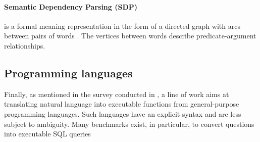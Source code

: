 
\paragraph{Semantic Dependency Parsing (SDP)} is a formal meaning representation in the form of a directed graph with arcs between pairs of words \parencite{oepen_15}. The vertices between words describe predicate-argument relationships. 

\subsection{Programming languages}

Finally, as mentioned in the survey conducted in \textcite{kamath_19}, a line of work aims at translating natural language into executable functions from general-purpose programming languages. Such languages have an explicit syntax and are less subject to ambiguity. Many benchmarks exist, in particular, to convert questions into executable SQL queries \parencite{dahl_94, radev_18}

